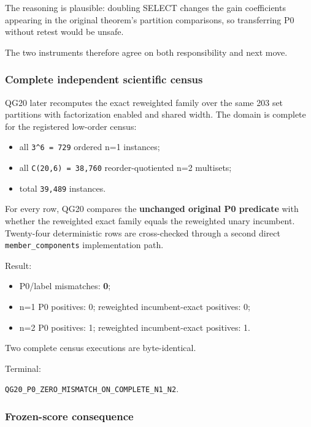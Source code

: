 \documentclass[10pt]{article}
\providecommand{\tightlist}{%
  \setlength{\itemsep}{0pt}\setlength{\parskip}{0pt}}
\begin{document}
The reasoning is plausible: doubling SELECT changes the gain
coefficients appearing in the original theorem's partition comparisons,
so transferring P0 without retest would be unsafe.

The two instruments therefore agree on both responsibility and next
move.

\hypertarget{complete-independent-scientific-census}{%
\subsubsection{Complete independent scientific
census}\label{complete-independent-scientific-census}}

QG20 later recomputes the exact reweighted family over the same 203 set
partitions with factorization enabled and shared width. The domain is
complete for the registered low-order census:

\begin{itemize}
\tightlist
\item
  all \texttt{3\^{}6\ =\ 729} ordered n=1 instances;
\item
  all \texttt{C(20,6)\ =\ 38,760} reorder-quotiented n=2 multisets;
\item
  total \texttt{39,489} instances.
\end{itemize}

For every row, QG20 compares the \textbf{unchanged original P0
predicate} with whether the reweighted exact family equals the
reweighted unary incumbent. Twenty-four deterministic rows are
cross-checked through a second direct \texttt{member\_components}
implementation path.

Result:

\begin{itemize}
\tightlist
\item
  P0/label mismatches: \textbf{0};
\item
  n=1 P0 positives: 0; reweighted incumbent-exact positives: 0;
\item
  n=2 P0 positives: 1; reweighted incumbent-exact positives: 1.
\end{itemize}

Two complete census executions are byte-identical.

Terminal:

\texttt{QG20\_P0\_ZERO\_MISMATCH\_ON\_COMPLETE\_N1\_N2}.

\hypertarget{frozen-score-consequence}{%
\subsubsection{Frozen-score
consequence}\label{frozen-score-consequence}}
\end{document}
